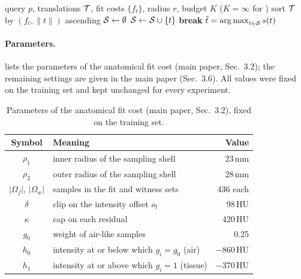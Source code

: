 \begin{algorithm}[!ht]
\caption{Fit-ordered diverse search}
\label{alg:diverse}
\begin{algorithmic}[1]
\Require query $p$, translations $\mathcal{T}$, fit costs $\{f_t\}$, radius $r$, budget $K$ ($K{=}\infty$ for \ours)
\State sort $\mathcal{T}$ by $(f_t, \|t\|)$ ascending
\State $\mathcal{S} \gets \emptyset$ 
   
    \State $\mathcal{S} \gets \mathcal{S} \cup \{t\}$
     \textbf{break} \EndIf
  \EndIf
\EndFor
\State \Return $\hat{t} = \operatorname*{arg\,max}_{t \in \mathcal{S}} s(t)$ 
\end{algorithmic}
\end{algorithm}

\paragraph{Parameters.}
 lists the parameters of the anatomical fit cost (main paper, Sec.~3.2); the remaining settings are given in the main paper (Sec.~3.6).
All values were fixed on the training set and kept unchanged for every experiment.

\begin{table}[t]
\centering
\footnotesize
\setlength{\tabcolsep}{4pt}
\caption{Parameters of the anatomical fit cost (main paper, Sec.~3.2), fixed on the training set.}
\label{tab:params}
\begin{tabular}{@{}clr@{}}
\toprule
Symbol & Meaning & Value \\
\midrule
$\rho_1$ & inner radius of the sampling shell & 23\,mm \\
$\rho_2$ & outer radius of the sampling shell & 28\,mm \\
$|\Omega_f|$, $|\Omega_w|$ & samples in the fit and witness sets & 436 each \\
$\delta$ & clip on the intensity offset $o_t$ & 98\,HU \\
$\kappa$ & cap on each residual & 420\,HU \\
$g_0$ & weight of air-like samples & 0.25 \\
$h_0$ & intensity at or below which $g_i = g_0$ (air) & $-860$\,HU \\
$h_1$ & intensity at or above which $g_i = 1$ (tissue) & $-370$\,HU \\
\bottomrule
\end{tabular}
\end{table}

